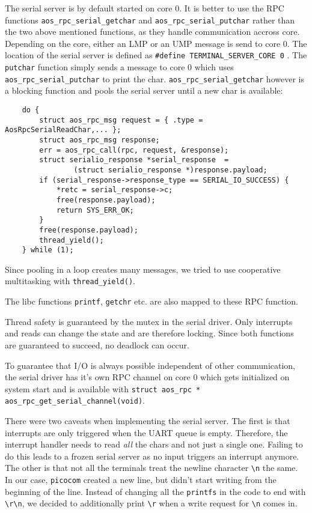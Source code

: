 The serial server is by default started on core $0$. It is better to use the RPC functions \verb|aos_rpc_serial_getchar| and \verb|aos_rpc_serial_putchar| rather than the two above mentioned functions, as they handle communication accross core. Depending on the core, either an LMP or an UMP message is send to core $0$. The location of the serial server is defined as \verb|#define TERMINAL_SERVER_CORE 0| . The \verb|putchar| function simply sends a message to core $0$ which uses \verb|aos_rpc_serial_putchar| to print the char. \verb|aos_rpc_serial_getchar| however is a blocking function and pools the serial server until a new char is available:

\begin{verbatim}
    do {
        struct aos_rpc_msg request = { .type = AosRpcSerialReadChar,... };
        struct aos_rpc_msg response;
        err = aos_rpc_call(rpc, request, &response);
        struct serialio_response *serial_response  = 
                (struct serialio_response *)response.payload;
        if (serial_response->response_type == SERIAL_IO_SUCCESS) {
            *retc = serial_response->c;
            free(response.payload);
            return SYS_ERR_OK;
        }
        free(response.payload);
        thread_yield();
    } while (1);
\end{verbatim}

Since pooling in a loop creates many messages, we tried to use cooperative multitasking with \verb|thread_yield()|.

The libc functions \verb|printf|,  \verb|getchr| etc. are also mapped to these RPC function.

Thread safety is guaranteed by the mutex in the serial driver. Only interrupts and reads can change the state and are therefore locking. Since both functions are guaranteed to succeed, no deadlock can occur. 

To guarantee that I/O is always possible independent of other communication, the serial driver has it's own RPC channel on core $0$ which gets initialized on system start and is available with \verb|struct aos_rpc * aos_rpc_get_serial_channel(void)|.

There were two caveats when implementing the serial server. The first is that interrupts are only triggered when the UART queue is empty. Therefore, the interrupt handler needs to read \emph{all} the chars and not just a single one. Failing to do this leads to a frozen serial server as no input triggers an interrupt anymore. The other is that not all the terminals treat the newline character \verb|\n| the same. In our case, \verb|picocom| created a new line, but didn't start writing from the beginning of the line. Instead of changing all the \verb|printfs| in the code to end with \verb|\r\n|, we decided to additionally print \verb|\r| when a write request for \verb|\n| comes in.

